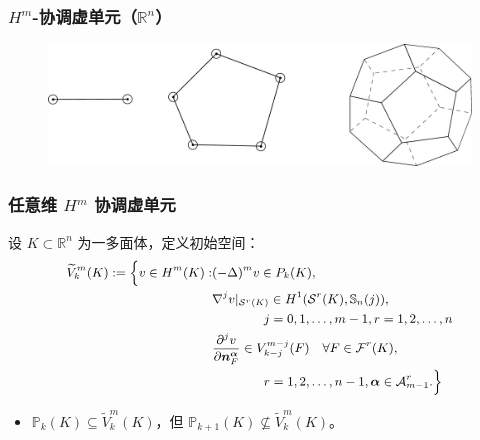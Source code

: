 \documentclass[notheorems,serif]{beamer}
\begin{document}
\begin{frame}
    \frametitle{$H^m$-协调虚单元（$\mathbb{R}^n$）}
    \begin{figure}[H]
        \centering
        \includegraphics[scale=0.3]{../figures/bitmap.pdf}
    \end{figure}
\end{frame}

\begin{frame}
    \frametitle{任意维 $H^m$ 协调虚单元}
    设 $K \subset \mathbb{R}^n$ 为一多面体，定义初始空间：
    $$
    \small{
    \begin{aligned}
      \widetilde{V}_k^m(K) := \Big\{v \in  H^m(K) :&  (-\Delta)^m v \in P_k(K),\\
          & \nabla^j v|_{\mathcal{S}^r(K)} \in H^1(\mathcal{S}^r(K),\mathbb{S}_n(j)), \\
          & \qquad\qquad j = 0, 1, \dots, m-1, r = 1, 2, \dots, n\\
          & \frac{\partial^j v}{\partial
          \boldsymbol{n}_F^{\boldsymbol{\alpha}}} \in V_{k-j}^{m-j}(F) \quad 
          \forall F \in \mathcal{F}^r(K), \\
          &\qquad\qquad r = 1, 2, \dots, n-1, \boldsymbol{\alpha} \in \mathcal{A}_{m-1}^r.
          \Big\}
    \end{aligned}
    }
    $$
    \begin{itemize}
        \item $\mathbb{P}_k(K) \subseteq \widetilde{V}_k^m(K)$，但
            $\mathbb{P}_{k+1}(K) \not\subseteq \widetilde{V}_k^m(K)$。
    \end{itemize}
\end{frame}
\end{document}
